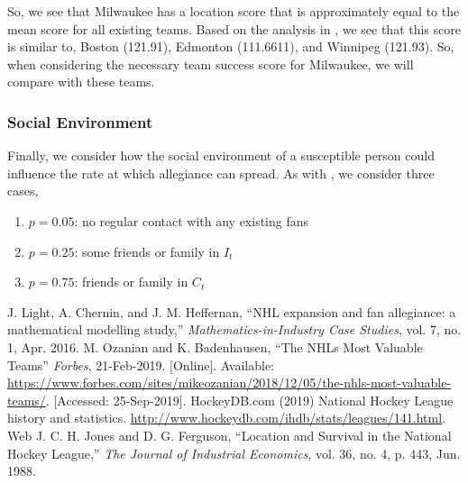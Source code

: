 \documentclass[11pt]{report}            %
\begin{document}
So, we see that Milwaukee has a location score that is approximately equal to the mean score for all existing teams. Based on the analysis in \cite{light}, we see that this score is similar to, Boston (121.91), Edmonton (111.6611), and Winnipeg (121.93). So, when considering the necessary team success score for Milwaukee, we will compare with these teams.

\subsubsection*{Social Environment}
Finally, we consider how the social environment of a susceptible person could influence the rate at which allegiance can spread. As with \cite{light}, we consider three cases,
\begin{enumerate}
\item $p=0.05$: no regular contact with any existing fans\\
\item $p=0.25$: some friends or family in $I_t$\\
\item $p=0.75$: friends or family in $C_t$
\end{enumerate}


\begin{thebibliography}{9}
 J. Light, A. Chernin, and J. M. Heffernan, ``NHL expansion and fan allegiance: a mathematical modelling study,” \textit{Mathematics-in-Industry Case Studies}, vol. 7, no. 1, Apr. 2016.
 M. Ozanian and K. Badenhausen, ``The NHLs Most Valuable Teams” \textit{Forbes}, 21-Feb-2019. [Online]. Available: \url{https://www.forbes.com/sites/mikeozanian/2018/12/05/the-nhls-most-valuable-teams/}. [Accessed: 25-Sep-2019].
  HockeyDB.com (2019) National Hockey League history and statistics. \url{http://www.hockeydb.com/ihdb/stats/leagues/141.html}. Web
J. C. H. Jones and D. G. Ferguson, ``Location and Survival in the National Hockey League,” \textit{The Journal of Industrial Economics}, vol. 36, no. 4, p. 443, Jun. 1988.
\end{thebibliography}
\end{document}
